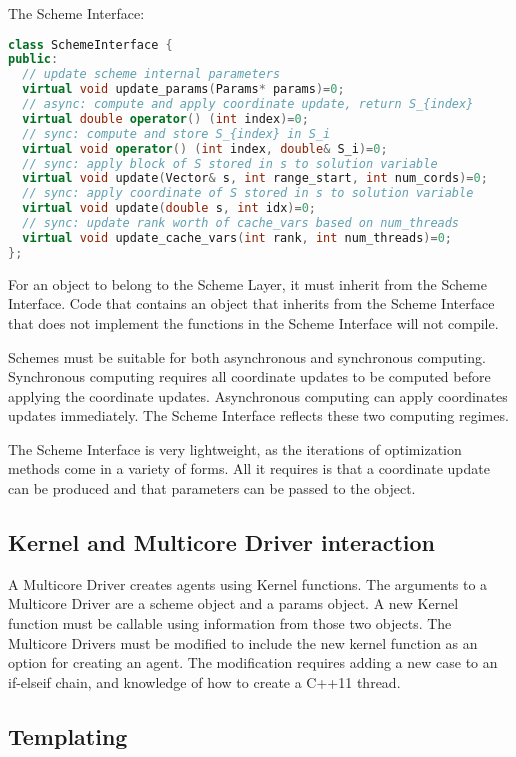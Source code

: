The Scheme Interface:
\begin{lstlisting}[language=C++]
class SchemeInterface {
public:
  // update scheme internal parameters
  virtual void update_params(Params* params)=0;
  // async: compute and apply coordinate update, return S_{index}
  virtual double operator() (int index)=0;
  // sync: compute and store S_{index} in S_i
  virtual void operator() (int index, double& S_i)=0;
  // sync: apply block of S stored in s to solution variable
  virtual void update(Vector& s, int range_start, int num_cords)=0;
  // sync: apply coordinate of S stored in s to solution variable
  virtual void update(double s, int idx)=0;
  // sync: update rank worth of cache_vars based on num_threads
  virtual void update_cache_vars(int rank, int num_threads)=0;
};
\end{lstlisting}
For an object to belong to the Scheme Layer, it must inherit from the Scheme Interface.
Code that contains an object that inherits from the Scheme Interface that does not implement the functions in the Scheme Interface will not compile.

Schemes must be suitable for both asynchronous and synchronous computing. Synchronous computing requires all coordinate updates to be computed before applying the coordinate updates. Asynchronous computing can apply coordinates updates immediately. The Scheme Interface reflects these two computing regimes.

The Scheme Interface is very lightweight, as the iterations of optimization methods come in a variety of forms.  All it requires is that a coordinate update can be produced and that parameters can be passed to the object.




\subsection{Kernel and Multicore Driver interaction}

A Multicore Driver creates agents using Kernel functions. The arguments to a Multicore Driver are a scheme object and a params object. A new Kernel function must be callable using information from those two objects. The Multicore Drivers must be modified to include the new kernel function as an option for creating an agent. The modification requires adding a new case to an if-elseif chain, and knowledge of how to create a C++11 thread.

\subsection{Templating}

